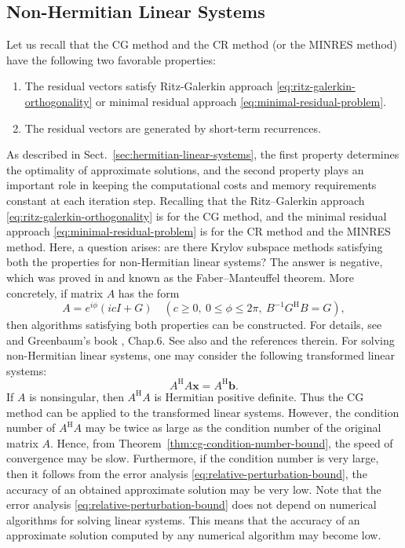 \subsection{{Non-Hermitian Linear Systems}}\label{sec:nonhermitian-linear-systems}
{Let us recall that the CG method and the CR method (or the MINRES method) have the following two favorable properties:}
\begin{enumerate}
\item{The residual vectors satisfy Ritz-Galerkin approach \eqref{eq:ritz-galerkin-orthogonality} or minimal residual approach \eqref{eq:minimal-residual-problem}.}
\item{The residual vectors are generated by short-term recurrences.}
\end{enumerate}
{As described in Sect.\ \ref{sec:hermitian-linear-systems}, the first property determines the optimality of approximate solutions, and the second property plays an important role in keeping the computational costs and memory requirements constant at each iteration step. Recalling that the Ritz--Galerkin approach \eqref{eq:ritz-galerkin-orthogonality} is for the CG method, and the minimal residual approach \eqref{eq:minimal-residual-problem} is for the CR method and the MINRES method.}
{Here, a question arises: are there Krylov subspace methods satisfying both the properties for non-Hermitian linear systems? The answer is negative, which was proved in  and known as the Faber--Manteuffel theorem. More concretely, if matrix $A$ has the form}
\[A=e^{i\phi}(icI+G)\quad(c\ge0,\ 0\le\phi\le2\pi,\ B^{-1}G^{\mathrm H}B=G),\]
{then algorithms satisfying both properties can be constructed. For details, see  and Greenbaum's book , Chap.6. See also  and the references therein.}
{For solving non-Hermitian linear systems, one may consider the following transformed linear systems:}
\begin{equation}\label{eq:nonhermitian-normal-equations}A^{\mathrm H}A\bm x=A^{\mathrm H}\bm b.\end{equation}
{If $A$ is nonsingular, then $A^{\mathrm H}A$ is Hermitian positive definite. Thus the CG method can be applied to the transformed linear systems. However, the condition number of $A^{\mathrm H}A$ may be twice as large as the condition number of the original matrix $A$. Hence, from Theorem\ \ref{thm:cg-condition-number-bound}, the speed of convergence may be slow. Furthermore, if the condition number is very large, then it follows from the error analysis \eqref{eq:relative-perturbation-bound}, the accuracy of an obtained approximate solution may be very low. Note that the error analysis \eqref{eq:relative-perturbation-bound} does not depend on numerical algorithms for solving linear systems. This means that the accuracy of an approximate solution computed by any numerical algorithm may become low.}
